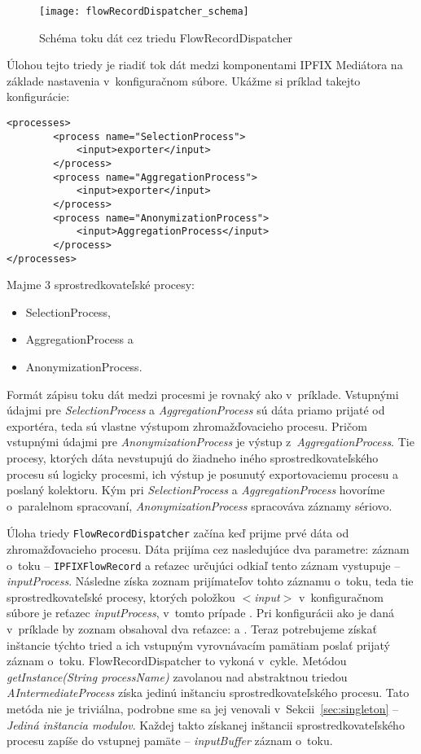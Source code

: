 \begin{figure}[ht!]
\centering
\texttt{[image: flowRecordDispatcher\_schema]}
\caption{Schéma toku dát cez triedu FlowRecordDispatcher}\label{o:flowRecordDispatcher_schema}
\end{figure}

Úlohou tejto triedy je riadiť tok dát medzi komponentami IPFIX Mediátora na základe nastavenia
v~konfiguračnom súbore.
Ukážme si príklad takejto konfigurácie:
\begin{verbatim}
<processes>
        <process name="SelectionProcess">
            <input>exporter</input>
        </process>
        <process name="AggregationProcess">
            <input>exporter</input>
        </process>
        <process name="AnonymizationProcess">
            <input>AggregationProcess</input>
        </process>
</processes>
\end{verbatim}

Majme 3 sprostredkovateľské procesy: 
\begin{itemize}
\item SelectionProcess,
\item AggregationProcess a 
\item AnonymizationProcess.
\end{itemize}

Formát zápisu toku dát medzi procesmi je rovnaký ako v~príklade. Vstupnými údajmi pre 
\emph{SelectionProcess} a \emph{AggregationProcess} sú dáta priamo prijaté od exportéra, teda sú 
vlastne výstupom  
zhromažďovacieho procesu. Pričom vstupnými údajmi pre \emph{AnonymizationProcess} je výstup 
z~\emph{AggregationProcess}. Tie procesy, ktorých dáta nevstupujú do žiadneho iného sprostredkovateľského 
procesu sú logicky  procesmi, ich výstup je posunutý exportovaciemu procesu a poslaný 
kolektoru. Kým pri \emph{SelectionProcess} a \emph{AggregationProcess} hovoríme o~paralelnom spracovaní, 
\emph{AnonymizationProcess} spracováva záznamy sériovo.

Úloha triedy \verb|FlowRecordDispatcher| začína keď prijme prvé dáta od zhromažďovacieho procesu. Dáta prijíma 
cez nasledujúce dva 
parametre: záznam o~toku -- \verb|IPFIXFlowRecord| a reťazec určujúci odkiaľ tento záznam vystupuje -- 
\emph{inputProcess}.
Následne získa zoznam prijímateľov tohto záznamu o~toku, teda tie sprostredkovateľské procesy, 
ktorých položkou \emph{$<$input$>$} v~konfiguračnom súbore je reťazec \emph{inputProcess}, v~tomto 
prípade . Pri konfigurácii ako je daná v~príklade by zoznam obsahoval dva reťazce: 
 a . Teraz potrebujeme získať inštancie týchto tried a ich 
vstupným vyrovnávacím pamätiam poslať 
prijatý záznam o~toku. FlowRecordDispatcher to vykoná v~cykle. 
Metódou \emph{getInstance(String processName)} zavolanou nad
abstraktnou triedou \emph{AIntermediateProcess} získa jedinú inštanciu sprostredkovateľského procesu. 
Tato metóda nie je triviálna, podrobne sme sa jej venovali v~Sekcii~\ref{sec:singleton} --
\emph{Jediná inštancia modulov}. Každej takto získanej 
inštancii sprostredkovateľského procesu zapíše do vstupnej pamäte -- \emph{inputBuffer} záznam o~toku.

